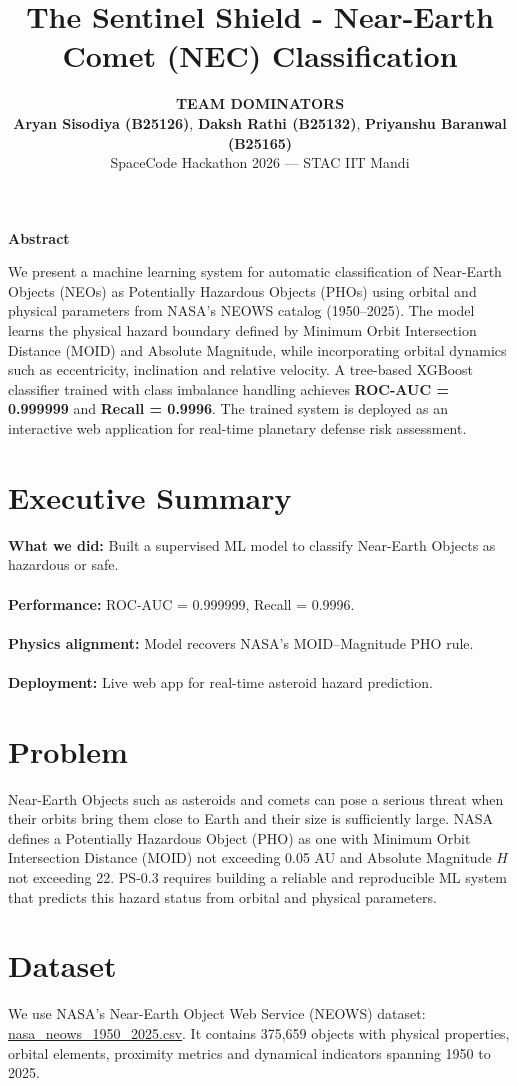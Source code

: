 \documentclass[11pt,a4paper]{article}
\title{\textbf{\Large The Sentinel Shield - Near-Earth Comet (NEC) Classification}}
\author{
\textbf{\MakeUppercase{TEAM DOMINATORS}}\\
\textbf{Aryan Sisodiya (B25126)}, \textbf{Daksh Rathi (B25132)}, \textbf{Priyanshu Baranwal (B25165)}\\
SpaceCode Hackathon 2026 — STAC IIT Mandi
}
\date{}
\begin{document}
\maketitle

\begin{center}
{\large\textbf{Abstract}}
\end{center}
We present a machine learning system for automatic classification of Near-Earth Objects (NEOs) as
Potentially Hazardous Objects (PHOs) using orbital and physical parameters from NASA’s NEOWS catalog
(1950--2025). The model learns the physical hazard boundary defined by Minimum Orbit Intersection
Distance (MOID) and Absolute Magnitude, while incorporating orbital dynamics such as eccentricity,
inclination and relative velocity. A tree-based XGBoost classifier trained with class imbalance handling
achieves \textbf{ROC-AUC = 0.999999} and \textbf{Recall = 0.9996}. The trained system is deployed as an
interactive web application for real-time planetary defense risk assessment.

\section*{Executive Summary}
\textbf{What we did:} Built a supervised ML model to classify Near-Earth Objects as hazardous or safe.\\\\  
\textbf{Performance:} ROC-AUC = 0.999999, Recall = 0.9996.\\\\  
\textbf{Physics alignment:} Model recovers NASA’s MOID--Magnitude PHO rule.\\\\  
\textbf{Deployment:} Live web app for real-time asteroid hazard prediction.

\section{Problem}
Near-Earth Objects such as asteroids and comets can pose a serious threat when their orbits bring them
close to Earth and their size is sufficiently large. NASA defines a Potentially Hazardous Object (PHO)
as one with Minimum Orbit Intersection Distance (MOID) not exceeding 0.05 AU and Absolute Magnitude
$H$ not exceeding 22. PS-0.3 requires building a reliable and reproducible ML system that predicts this
hazard status from orbital and physical parameters.

\section{Dataset}
We use NASA’s Near-Earth Object Web Service (NEOWS) dataset:
\href{https://drive.google.com/file/d/1BN6ro6Qtfd4j7tUtlrgVzZ_Ts3axj6v0/view}{nasa\_neows\_1950\_2025.csv}.
It contains 375,659 objects with physical properties, orbital elements, proximity metrics and
dynamical indicators spanning 1950 to 2025.
\end{document}
